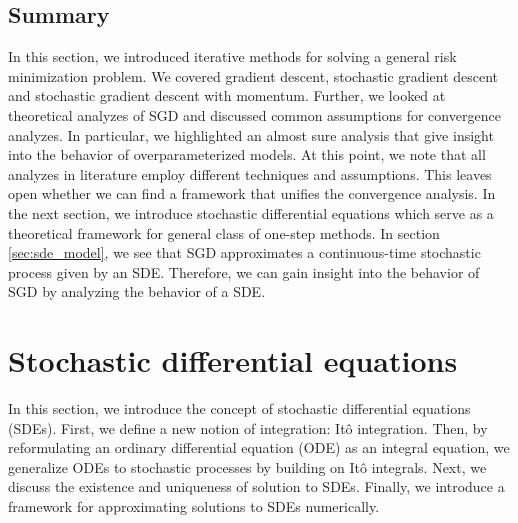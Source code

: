 \documentclass[12pt]{article}
\theoremstyle{definition}
\numberwithin{equation}{section}
\begin{document}
\subsection{Summary}
In this section, we introduced iterative methods for solving a general risk minimization problem. We covered gradient descent, stochastic gradient descent and stochastic gradient descent with momentum. Further, we looked at theoretical analyzes of SGD and discussed common assumptions for convergence analyzes. In particular, we highlighted an almost sure analysis that give insight into the behavior of overparameterized models. 
At this point, we note that all analyzes in literature employ different techniques and assumptions. This leaves open whether we can find a framework that unifies the convergence analysis. In the next section, we introduce stochastic differential equations which serve as a theoretical framework for general class of one-step methods. In section \ref{sec:sde_model}, we see that SGD approximates a continuous-time stochastic process given by an SDE. Therefore, we can gain insight into the behavior of SGD by analyzing the behavior of a SDE.

\section{Stochastic differential equations}
\label{sec:BackgroundSDETheory}
In this section, we introduce the concept of stochastic differential equations (SDEs). First, we define a new notion of integration: Itô integration. Then, by reformulating an ordinary differential equation (ODE) as an integral equation, we generalize ODEs to stochastic processes by building on Itô integrals. Next, we discuss the existence and uniqueness of solution to SDEs. Finally, we introduce a framework for approximating solutions to SDEs numerically.
\end{document}
